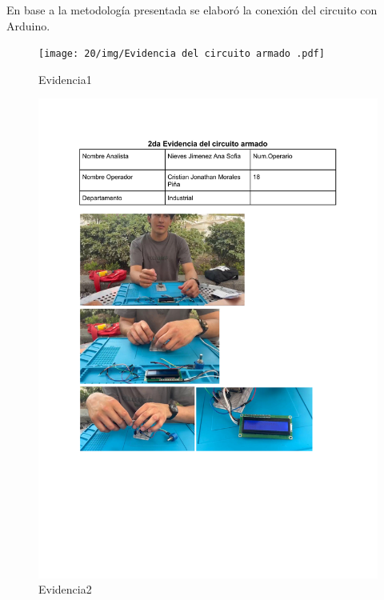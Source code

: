     En base a la metodología presentada se elaboró la conexión del circuito con Arduino.
    \begin{figure}[H]
        \centering
        \texttt{[image: 20/img/Evidencia del circuito armado .pdf]}
        \caption{Evidencia1}
        \end{figure}
        \begin{figure}[H]
         \includegraphics[trim = {0mm 0mm 0mm 0mm},clip,scale=0.3]{20/img/2da Evidencia del circuito armado.pdf}
        \caption{Evidencia2}
    \end{figure}
    
